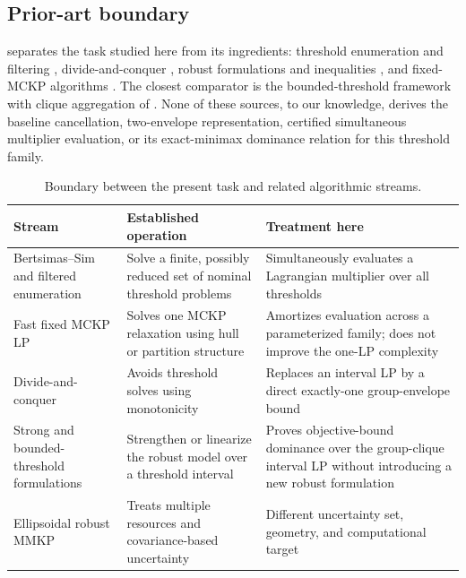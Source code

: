 \documentclass[11pt]{article}
\theoremstyle{plain}
\theoremstyle{definition}
\theoremstyle{remark}
\begin{document}
\subsection{Prior-art boundary}

 separates the task studied here from its ingredients: threshold enumeration and filtering \citep{BertsimasSim2003,AlvarezMiranda2013,LeeKwon2014}, divide-and-conquer \citep{Hansknecht2018}, robust formulations and inequalities \citep{Atamturk2006,FischettiMonaci2012,Monaci2013,JoungPark2021,JoungOhLee2023}, and fixed-MCKP algorithms \citep{SinhaZoltners1979,Zemel1980,Dyer1984,Szkaliczki2025}.  The closest comparator is the bounded-threshold framework with clique aggregation of \citet{BusingGersingKoster2023}.  None of these sources, to our knowledge, derives the baseline cancellation, two-envelope representation, certified simultaneous multiplier evaluation, or its exact-minimax dominance relation for this threshold family.

\begin{table}[t]
\centering
\caption{Boundary between the present task and related algorithmic streams.}
\label{tab:prior-art}
\small
\renewcommand{\arraystretch}{1.18}
\begin{tabular}{>{\raggedright\arraybackslash}p{}>{\raggedright\arraybackslash}p{}>{\raggedright\arraybackslash}p{}}
\toprule
Stream & Established operation & Treatment here \\
\midrule
Bertsimas--Sim and filtered enumeration & Solve a finite, possibly reduced set of nominal threshold problems & Simultaneously evaluates a Lagrangian multiplier over all thresholds \\\addlinespace[4pt]
Fast fixed MCKP LP & Solves one MCKP relaxation using hull or partition structure & Amortizes evaluation across a parameterized family; does not improve the one-LP complexity \\\addlinespace[4pt]
Divide-and-conquer & Avoids threshold solves using monotonicity & Replaces an interval LP by a direct exactly-one group-envelope bound \\\addlinespace[4pt]
Strong and bounded-threshold formulations & Strengthen or linearize the robust model over a threshold interval & Proves objective-bound dominance over the group-clique interval LP without introducing a new robust formulation \\\addlinespace[4pt]
Ellipsoidal robust MMKP \citep{Caserta2019} & Treats multiple resources and covariance-based uncertainty & Different uncertainty set, geometry, and computational target \\
\bottomrule
\end{tabular}
\end{table}
\end{document}
